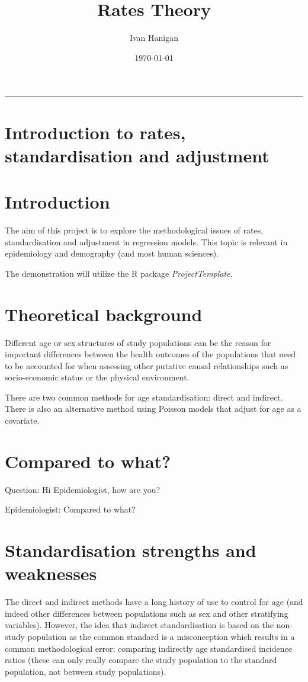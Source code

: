 \documentclass[a4paper]{article}
\title{Rates Theory}
\author{Ivan Hanigan}
\date{\today}
\begin{document}
\maketitle

\tableofcontents
\hrule

\section{Introduction to rates, standardisation and adjustment}
\label{sec-1}

\section{Introduction}
The aim of this project is to explore the methodological issues of rates, standardisation and adjustment in regression models.
This topic is relevant in epidemiology and demography (and most human sciences).

The demonstration will utilize the R package \emph{ProjectTemplate}.
\section{Theoretical background}
\label{sec-2}

Different age or sex structures of study populations can be the reason for important differences between the health outcomes of the populations that need to be accounted for when assessing other putative causal relationships such as socio-economic status or the physical environment. 

There are two common methods for age standardisation: direct and indirect. There is also an alternative method using Poisson models that adjust for age as a covariate.
\section{Compared to what?}
\label{sec-3}

Question: Hi Epidemiologist, how are you?

Epidemiologist: Compared to what?
\section{Standardisation strengths and weaknesses}
\label{sec-4}

The direct and indirect methods have a long history of use to control for age (and indeed other differences between populations such as sex and other stratifying variables).  However, the idea that indirect standardisation is based on the non-study population as the common standard is a misconception which results in a common methodological error: comparing indirectly age standardised incidence ratios (these can only really compare the study population to the standard population, not between study populations). 
\end{document}
